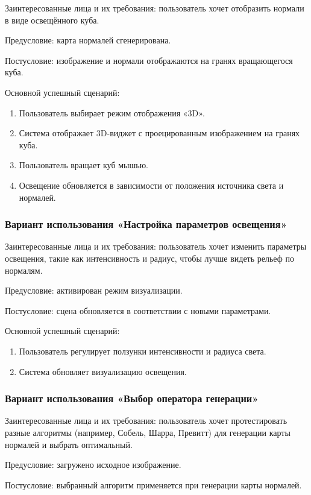 Заинтересованные лица и их требования: пользователь хочет отобразить нормали в виде освещённого куба.

Предусловие: карта нормалей сгенерирована.

Постусловие: изображение и нормали отображаются на гранях вращающегося куба.

Основной успешный сценарий:
\begin{enumerate}
	\item Пользователь выбирает режим отображения «3D».
	\item Система отображает 3D-виджет с проецированным изображением на гранях куба.
	\item Пользователь вращает куб мышью.
	\item Освещение обновляется в зависимости от положения источника света и нормалей.
\end{enumerate}
\subsubsection{Вариант использования «Настройка параметров освещения»}

Заинтересованные лица и их требования: пользователь хочет изменить параметры освещения, такие как интенсивность и радиус, чтобы лучше видеть рельеф по нормалям.

Предусловие: активирован режим визуализации.

Постусловие: сцена обновляется в соответствии с новыми параметрами.

Основной успешный сценарий:
\begin{enumerate}
	\item Пользователь регулирует ползунки интенсивности и радиуса света.
	\item Система обновляет визуализацию освещения.
\end{enumerate}
\subsubsection{Вариант использования «Выбор оператора генерации»}

Заинтересованные лица и их требования: пользователь хочет протестировать разные алгоритмы (например, Собель, Шарра, Превитт) для генерации карты нормалей и выбрать оптимальный.

Предусловие: загружено исходное изображение.

Постусловие: выбранный алгоритм применяется при генерации карты нормалей.

